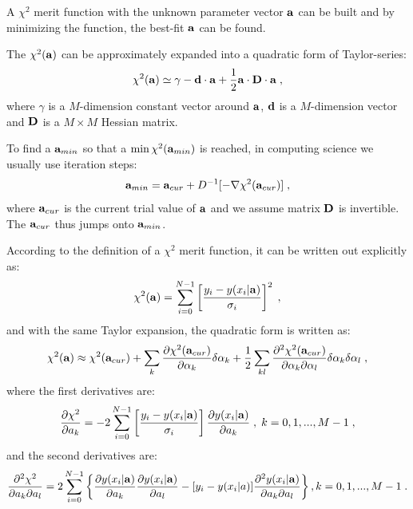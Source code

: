 A $\chi^2$ merit function with the unknown parameter vector $\bf a$ can be built and by minimizing the function, the best-fit $\bf a$ can be found.

The $\chi^2(\bf a)$ can be approximately expanded into a quadratic form of Taylor-series:
\begin{equation} \label{eq:1}
\chi^2({\bf a})\simeq \gamma-{\bf d\cdot a}+\frac{1}{2}{\bf a\cdot D\cdot a} \; ,
\end{equation}
where $\gamma$ is a $M$-dimension constant vector around $\bf a$, $\bf d$ is a $M$-dimension vector and $\bf D$ is a $M\times M$ Hessian matrix.

To find a ${\bf a}_{min}$ so that a $\min\chi^2({\bf a}_{min})$ is reached, in computing science we usually use iteration steps: 
\begin{equation} \label{eq:2}{\bf a}_{min}={\bf a}_{cur}+D^{-1}[-\nabla\chi^2({\bf a}_{cur})] \; ,
\end{equation} 
where ${\bf a}_{cur}$ is the current trial value of $\bf a$ and we assume matrix $\bf D$ is invertible. The ${\bf a}_{cur}$ thus jumps onto ${\bf a}_{min}$. 

According to the definition of a $\chi^2$ merit function, it can be written out explicitly as:
\begin{equation}
\chi^2({\bf a})=\sum_{i=0}^{N-1}\left[\frac{y_i-y(x_i|{\bf a})}{\sigma_i}\right]^2 \; ,
\end{equation}
and with the same Taylor expansion, the quadratic form is written as:
\begin{equation}\label{eq:3}
\chi^2({\bf a})\approx\chi^2({\bf a}_{cur})+\sum_k\frac{\partial \chi^2({\bf a}_{cur})}{\partial \alpha_k}\delta\alpha_k+\frac{1}{2}\sum_{kl}\frac{\partial^2\chi^2({\bf a}_{cur})}{\partial\alpha_k\partial\alpha_l}\delta\alpha_k\delta\alpha_l \; , 
\end{equation}
where the first derivatives are:
\begin{equation}\label{eq:4}
\frac{\partial \chi^2}{\partial a_k}=-2\sum_{i=0}^{N-1}\left[\frac{y_i-y(x_i|{\bf a})}{\sigma_i}\right]\frac{\partial y(x_i|{\bf a})}{\partial a_k}\; ,\; k = 0,1,...,M-1 \; ,
\end{equation}
and the second derivatives are:
\begin{equation}\label{eq:5}
\frac{\partial^2 \chi^2}{\partial a_k\partial a_l}=2\sum_{i=0}^{N-1}\left\{\frac{\partial y(x_i|{\bf a})}{\partial a_k}\frac{\partial y(x_i|{\bf a})}{\partial a_l}-[y_i-y(x_i|a)]\frac{\partial^2 y(x_i|{\bf a})}{\partial a_k\partial a_l}\right\}, k = 0, 1, ..., M-1 \;.
\end{equation}

